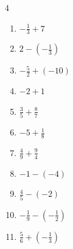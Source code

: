 \begin{multicols}{4}
\begin{enumerate}

  \item $\displaystyle -\frac{1}{3} + 7$


\columnbreak %

  \item $\displaystyle 2 - \left(-\frac{1}{3}\right)$


  \item $\displaystyle -\frac{5}{2} + \left(-10\right)$


  \item $\displaystyle -2 + 1$

        \phantom{$\displaystyle =-1$}

  \item $\displaystyle \frac{3}{5} + \frac{8}{7}$


  \item $\displaystyle -5 + \frac{1}{8}$


  \item $\displaystyle \frac{4}{9} + \frac{9}{4}$


  \item $\displaystyle -1 - \left(-4\right)$

        \phantom{$\displaystyle =3$}

  \item $\displaystyle \frac{4}{5} - \left(-2\right)$


  \item $\displaystyle -\frac{1}{9} - \left(-\frac{1}{2}\right)$


  \item $\displaystyle \frac{5}{6} + \left(-\frac{1}{3}\right)$


\columnbreak %


\end{enumerate}
\end{multicols}
